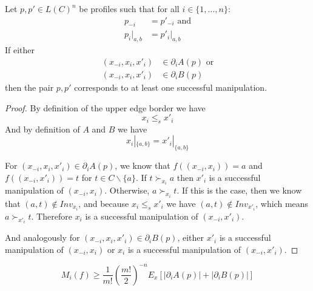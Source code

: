 	\begin{lemma}
		\label{manipulation-per-edge-in-a}
		Let $p, p' \in L(C)^n$ be profiles such that for all $i \in \{1, \ldots, n\}$:
		\begin{align*}
			p_{-i} &= p'_{-i} \textrm{ and} \\
			p_i|_{a,b} &= p'_i|_{a,b}
		\end{align*}
		If either
		\begin{align*}
			(x_{-i}, x_i, x'_i) &\in \partial_i A(p) \textrm{ or} \\
			(x_{-i}, x_i, x'_i) &\in \partial_i B(p)
		\end{align*}
		then the pair $p, p'$ corresponds to at least one successful manipulation.
	\end{lemma}

	\begin{proof}
		By definition of the upper edge border we have
		\[
			x_i \le_s x'_i
		\]
		And by definition of $A$ and $B$ we have
		\[
			x_i|_{\{a,b\}} = x'_i|_{\{a,b\}}
		\]

		For $(x_{-i}, x_i, x'_i) \in \partial_i A(p)$, we know that $f((x_{-i}, x_i)) = a$ and $f((x_{-i}, x'_i)) = t$ for $t \in C \backslash \{a\}$. If $t \succ_{x_i} a$ then $x'_i$ is a successful manipulation of $(x_{-i}, x_i)$. Otherwise, $a \succ_{x_i} t$. If this is the case, then we know that $(a, t) \notin Inv_{x_i}$, and because $x_i \le_s x'_i$ we have $(a, t) \notin Inv_{x'_i}$, which means $a \succ_{x'_i} t$. Therefore $x_i$ is a successful manipulation of $(x_{-i}, x'_i)$.

		And analogously for $(x_{-i}, x_i, x'_i) \in \partial_i B(p)$, either $x'_i$ is a successful manipulation of $(x_{-i}, x_i)$ or $x_i$ is a successful manipulation of $(x_{-i}, x'_i)$.
	\end{proof}

	\begin{lemma}
		\label{friedgut-lemma-7}
		\[
			M_i(f) \ge \frac{1}{m!} \left(\frac{m!}{2}\right)^{-n} E_x \left[|\partial_i A(p)| + |\partial_i B(p)| \right]
		\]
	\end{lemma}

